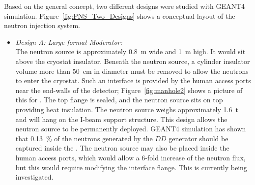 Based on the general concept, two different designs were studied with GEANT4 simulation. Figure~\ref{fig:PNS_Two_Designs} shows a conceptual layout of the neutron injection system. %

\begin{itemize}
\item {\it Design A: Large format Moderator:} \\
The neutron source is approximately \SI{0.8}{\m} wide and \SI{1}{\m} high. It would sit above the cryostat insulator. Beneath the neutron source, a cylinder insulator volume more than \SI{50}{\cm} in diameter must be removed to allow the neutrons to enter the cryostat. Such an interface is provided by the human access ports near the end-walls of the detector; Figure~\ref{fig:manhole2} shows a picture of this for . The top flange is sealed, and the neutron source sits on top 
providing heat insulation. The neutron source weighs approximately \SI{1.6}{\tonne} and will hang on the I-beam support structure. This design allows the neutron source to be permanently deployed. GEANT4 simulation has shown that \SI{0.13}{\%} of the neutrons generated by the $DD$ generator should be captured inside the  . The neutron source may also be placed inside the human access ports, which would allow a \num{6}-fold increase of the neutron flux, but this would require modifying the interface flange. This is currently being investigated.


\end{itemize}
